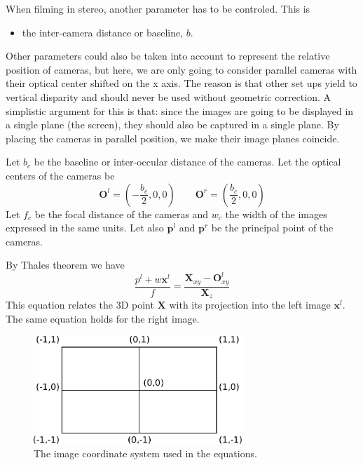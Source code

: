 \documentclass[12pt,a4paper]{article}
\def\x{\mathbf x}
\def\X{\mathbf X}
\def\O{\mathbf O}
\def\p{\mathbf p}
\begin{document}
When filming in stereo, another parameter has to be controled.  This is
\begin{itemize}
 \item the inter-camera distance or baseline, $b$.
\end{itemize}
Other parameters could also be taken into account to represent the relative position of cameras, but here, we are only going to consider parallel cameras with their optical center shifted on the x axis.  The reason is that other set ups yield to vertical disparity and should never be used without geometric correction.  A simplistic argument for this is that: since the images are going to be displayed in a single plane (the screen), they should also be captured in a single plane.  By placing the cameras in parallel position, we make their image planes coincide.


Let $b_c$ be the baseline or inter-occular distance of the cameras.  Let the optical centers of the cameras be
\begin{equation}
 \O^l = (-\frac{b_c}{2}, 0, 0)  \quad\quad  \O^r = (\frac{b_c}{2}, 0, 0)
\end{equation}
Let $f_c$ be the focal distance of the cameras and $w_c$ the width of the images expressed in the same units.  Let also $\p^l$ and $\p^r$ be the principal point of the cameras.


By Thales theorem we have
\begin{equation}
 \frac{p^l + w \x^l}{f} = \frac{\X_{xy} - \O^l_{xy}}{\X_z}
\end{equation}
This equation relates the 3D point $\X$ with its projection into the left image $\x^l$.  The same equation holds for the right image.


\begin{figure}
 \begin{center}
  \includegraphics[width=0.7\textwidth]{image_coordinate.pdf}
 \end{center}
 \caption{The image coordinate system used in the equations.}
\end{figure}
\end{document}
